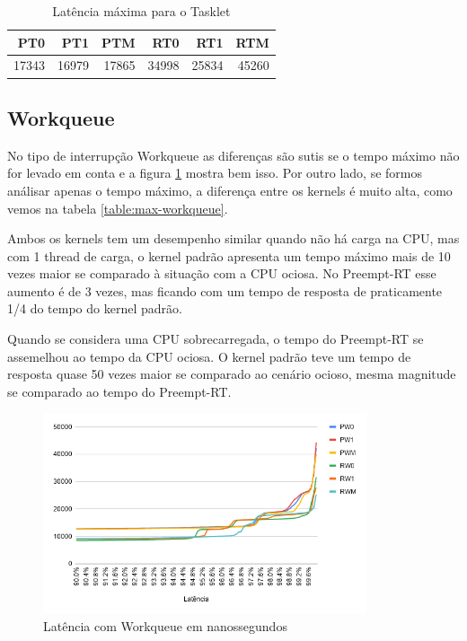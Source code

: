 \begin{table}[!htb]
    \centering
    \begin{center}
        \begin{tabular}{|r|r|r|r|r|r|}
            \toprule
                PT0 &    PT1 &    PTM &    RT0 &     RT1 &    RTM \\
            \midrule
                17343 &  16979 &  17865 & 34998 &  25834 &  45260  \\
            \bottomrule
        \end{tabular}
    \end{center}
    \caption{Latência máxima para o Tasklet}
    \label{table:max-tasklet}
\end{table}


\subsection{Workqueue}

No tipo de interrupção Workqueue as diferenças são sutis se o tempo máximo não for levado em conta e a figura \ref{grafico:workqueue} mostra bem isso. Por outro lado, se formos análisar apenas o tempo máximo, a diferença entre os kernels é muito alta, como vemos na tabela \ref{table:max-workqueue}.

Ambos os kernels tem um desempenho similar quando não há carga na CPU, mas com 1 thread de carga, o kernel padrão apresenta um tempo máximo mais de 10 vezes maior se comparado à situação com a CPU ociosa. No Preempt-RT esse aumento é de 3 vezes, mas ficando com um tempo de resposta de praticamente 1/4 do tempo do kernel padrão.

Quando se considera uma CPU sobrecarregada, o tempo do Preempt-RT se assemelhou ao tempo da CPU ociosa. O kernel padrão teve um tempo de resposta quase 50 vezes maior se comparado ao cenário ocioso, mesma magnitude se comparado ao tempo do Preempt-RT.

\begin{figure}[!htb]
    \centering
    \includegraphics[width=0.85\textwidth]{graficos/workqueue.png}
    \caption{Latência com Workqueue em nanossegundos}
    \label{grafico:workqueue}
\end{figure}


